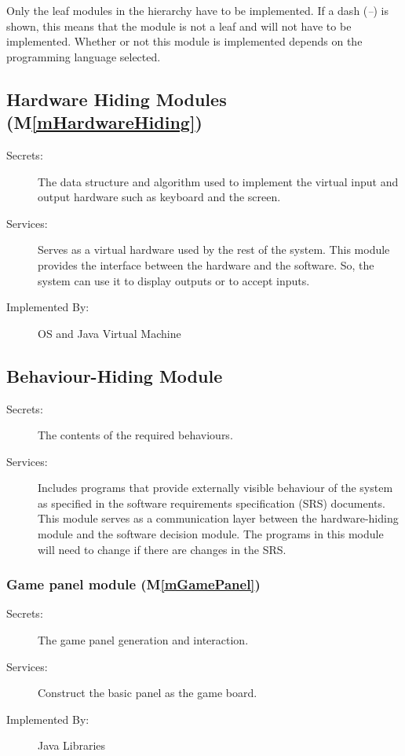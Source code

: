 \documentclass[12pt, titlepage]{article}
\newcommand{\mref}[1]{M\ref{#1}}
\begin{document}
Only the leaf modules in the
hierarchy have to be implemented. If a dash (\emph{--}) is shown, this means
that the module is not a leaf and will not have to be implemented. Whether or
not this module is implemented depends on the programming language
selected.

\subsection{Hardware Hiding Modules (\mref{mHardwareHiding})}

\begin{description}
\item[Secrets:]The data structure and algorithm used to implement the virtual input and 
output hardware such as keyboard and the screen.
\item[Services:]Serves as a virtual hardware used by the rest of the
  system. This module provides the interface between the hardware and the
  software. So, the system can use it to display outputs or to accept inputs.
\item[Implemented By:] OS and Java Virtual Machine
\end{description}

\subsection{Behaviour-Hiding Module}

\begin{description}
\item[Secrets:]The contents of the required behaviours.
\item[Services:]Includes programs that provide externally visible behaviour of
  the system as specified in the software requirements specification (SRS)
  documents. This module serves as a communication layer between the
  hardware-hiding module and the software decision module. The programs in this
  module will need to change if there are changes in the SRS.
\end{description}

\subsubsection{Game panel module (\mref{mGamePanel})}

\begin{description}
\item[Secrets:]The game panel generation and interaction.
\item[Services:]Construct the basic panel as the game board.
\item[Implemented By:] Java Libraries
\end{description}
\end{document}
